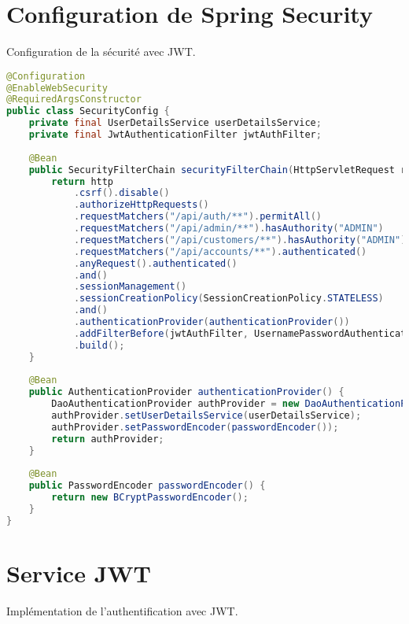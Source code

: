 \documentclass[12pt,a4paper]{report}
\begin{document}
\section{Configuration de Spring Security}
Configuration de la sécurité avec JWT.

\begin{lstlisting}[language=Java, caption=SecurityConfig.java]
@Configuration
@EnableWebSecurity
@RequiredArgsConstructor
public class SecurityConfig {
    private final UserDetailsService userDetailsService;
    private final JwtAuthenticationFilter jwtAuthFilter;
    
    @Bean
    public SecurityFilterChain securityFilterChain(HttpServletRequest request) {
        return http
            .csrf().disable()
            .authorizeHttpRequests()
            .requestMatchers("/api/auth/**").permitAll()
            .requestMatchers("/api/admin/**").hasAuthority("ADMIN")
            .requestMatchers("/api/customers/**").hasAuthority("ADMIN")
            .requestMatchers("/api/accounts/**").authenticated()
            .anyRequest().authenticated()
            .and()
            .sessionManagement()
            .sessionCreationPolicy(SessionCreationPolicy.STATELESS)
            .and()
            .authenticationProvider(authenticationProvider())
            .addFilterBefore(jwtAuthFilter, UsernamePasswordAuthenticationFilter.class)
            .build();
    }
    
    @Bean
    public AuthenticationProvider authenticationProvider() {
        DaoAuthenticationProvider authProvider = new DaoAuthenticationProvider();
        authProvider.setUserDetailsService(userDetailsService);
        authProvider.setPasswordEncoder(passwordEncoder());
        return authProvider;
    }
    
    @Bean
    public PasswordEncoder passwordEncoder() {
        return new BCryptPasswordEncoder();
    }
}
\end{lstlisting}

\section{Service JWT}
Implémentation de l'authentification avec JWT.
\end{document}
